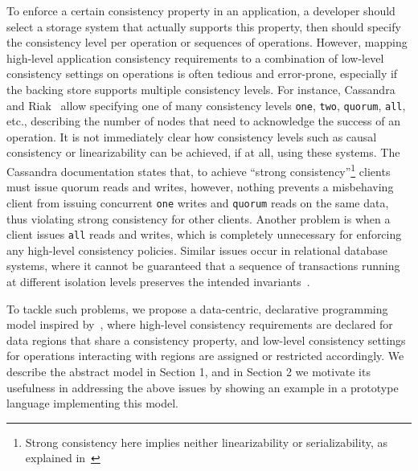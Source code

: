 \documentclass[preprint,numbers]{sigplanconf}
\begin{document}
To enforce a certain consistency
property in an application, a developer should select a storage system that
actually supports this property, then should specify the consistency level per
operation or
sequences of operations. However, mapping high-level application consistency requirements to a combination of
low-level consistency settings on operations is often tedious and error-prone, especially if
the backing store supports multiple consistency levels. For instance,
Cassandra~\cite{lakshman2010cassandra} and Riak~\cite{riak} allow specifying one of many
consistency levels
\texttt{one}, \texttt{two}, \texttt{quorum}, \texttt{all}, etc., describing the number of nodes that need to
acknowledge the success of an operation. It
is not immediately clear how consistency levels such as causal consistency or
linearizability can be achieved, if at all, using these systems. The Cassandra documentation
states that,
to achieve ``strong consistency''\footnote{Strong consistency here implies
neither linearizability or serializability, as explained in~\cite{sivaramakrishnan2016representation}} clients must issue quorum reads and writes,
however, nothing prevents a misbehaving client from issuing concurrent \texttt{one} writes and
\texttt{quorum} reads on the same data, thus violating strong consistency for other clients. Another
problem is when a client issues \texttt{all} reads and writes, which is completely
unnecessary for enforcing any high-level consistency policies. Similar issues
occur in relational database systems, where it cannot be guaranteed that a
sequence of transactions running at different isolation levels preserves the intended
invariants~\cite{gray1992transaction}. 


To tackle such problems, we propose a data-centric, declarative programming
model inspired by~\cite{dolby2012data}, where
high-level consistency requirements are declared for data regions that share a
consistency property, and low-level consistency settings for operations interacting with
regions are assigned or restricted accordingly. We
describe the abstract model in Section 1, and in Section 2 we motivate its usefulness in addressing the above issues by showing
an example in a prototype language implementing this model.
\end{document}
